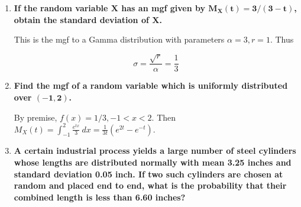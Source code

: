 \documentclass[10pt, oneside]{article}
\begin{document}
\begin{enumerate}[label=10.\arabic*]
which has mgf

\begin{align*}
M_X(t) &= \sum^{+\infty}_{k=1} e^{tk} q^{k-1} p \\
&= p(e^t + qe^{2t} + q^2 e^{3t} + \cdots) \\
&= pe^t (1 + qe^t + q^2 e^{2t} + \cdots)
\end{align*}

which resolves to a closed-form expression only if $t < -\ln(1-p)$, namely

\[ \boxed{ M_X(t) = \frac{pe^t}{1-qe^t} } \]

Now, let $X_1, ..., X_n$ be independently and identically distributed and geometric, with success for each $i$ having probability $p$. Moreover, let

\[ Y = \sum^n_{i=1} X_i \]

Then by the multiplicative property of the mgf's of the sum of random variables, we have

\[ M_Y(t) = \bigg( \frac{pe^t}{1-qe^t} \bigg)^n \]

which implies the geometric distribution has no reproductive property.

\item  \begin{tcolorbox}[
  colback=Cerulean!5!white,
  colframe=Cerulean!75!black]
\textbf{If the random variable $\bm{X}$ has an mgf given by $\bm{M_X(t) = 3/(3-t)}$, obtain the standard deviation of $\bm{X}$.}
\end{tcolorbox}

This is the mgf to a Gamma distribution with parameters $\alpha = 3, r = 1$. Thus

\[ \sigma = \frac{\sqrt{r}}{\alpha} = \boxed{\frac{1}{3}} \]

\item  \begin{tcolorbox}[
  colback=Cerulean!5!white,
  colframe=Cerulean!75!black]
\textbf{Find the mgf of a random variable which is uniformly distributed over $\bm{(-1,2)}$.}
\end{tcolorbox}

By premise, $f(x) = 1/3, -1 < x < 2$. Then $M_X(t) = \int^2_{-1} \frac{e^{tx}}{3} \ dx = \boxed{\frac{1}{3t}(e^{2t} - e^{-t})}$.

\item  \begin{tcolorbox}[
  colback=Cerulean!5!white,
  colframe=Cerulean!75!black]
\textbf{A certain industrial process yields a large number of steel cylinders whose lengths are distributed normally with mean 3.25 inches and standard deviation 0.05 inch. If two such cylinders are chosen at random and placed end to end, what is the probability that their combined length is less than 6.60 inches?}
\end{tcolorbox}


\end{enumerate}
\end{document}
